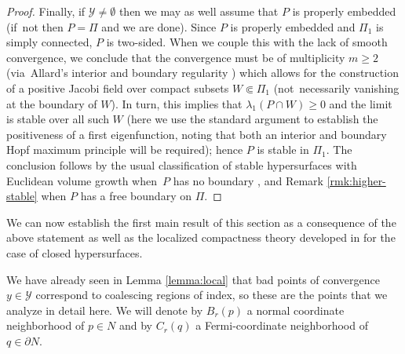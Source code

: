 \documentclass[JEP,XML,SOM,Unicode]{cedram}
\let\mathcal\mathscr
\newcounter{cas}
\theoremstyle{definition}
\let\cemb\Subset
\begin{document}
\begin{proof}
Finally, if $\mathcal{Y}\neq \emptyset$ then we may as well assume that $P$ is properly embedded (if~not then $P=\Pi$ and we are done). Since $P$ is properly embedded and $\Pi_1$ is simply connected, $P$ is two-sided. When we couple this with the lack of smooth convergence, we conclude that the convergence must be of multiplicity $m\geq 2$ (via~Allard's interior and boundary regularity \cf \cite[Ths.\,5,\,17]{ACS17}) which allows for the construction of a positive Jacobi field over compact subsets $W\cemb \Pi_1$ (not~necessarily vanishing at the boundary of $W$). In turn, this implies that $\lambda_1(P\cap W)\geq 0$ and the limit is stable over all such $W$ (here we use the standard argument to establish the positiveness of a first eigenfunction, noting that both an interior and boundary Hopf maximum principle will be required); hence $P$ is stable in $\Pi_1$. The conclusion follows by the usual classification of stable hypersurfaces with Euclidean volume growth when~$P$ has no boundary \cite{SS81}, and Remark \ref{rmk:higher-stable} when $P$ has a free boundary on $\Pi$.
\end{proof}

We can now establish the first main result of this section as a consequence of the above statement as well as the localized compactness theory developed in \cite[\S2]{BS17} for the case of closed hypersurfaces.

We have already seen in Lemma \ref{lemma:local} that bad points of convergence $y\in \mathcal{Y}$ correspond to coalescing regions of index, so these are the points that we analyze in detail here. We will denote by $B_r(p)$ a normal coordinate neighborhood of $p\in N$ and by $C_r(q)$ a Fermi-coordinate neighborhood of $q\in \partial N$.
\end{document}
